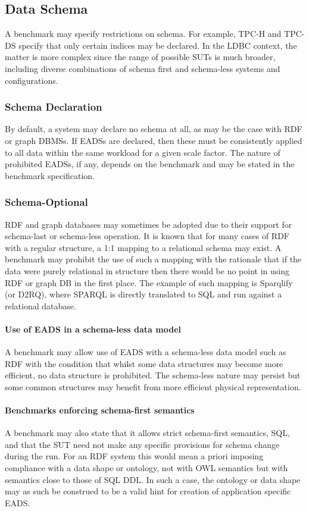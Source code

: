 \subsection{Data Schema}

A benchmark may specify restrictions on schema. For example, \mbox{TPC-H} and \mbox{TPC-DS} specify that only certain indices may be declared. In the LDBC context, the matter is more complex since the range of possible SUTs is much broader, including diverse combinations of schema first and schema-less systems and configurations.

\subsubsection{Schema Declaration}
By default, a system may declare no schema at all, as may be the case with RDF or graph DBMSs. If EADSs are declared, then these must be consistently applied to all data within the same workload for a given scale factor. The nature of prohibited EADSs, if any, depends on the benchmark and may be stated in the benchmark specification.

\subsubsection{Schema-Optional}

RDF and graph databases may sometimes be adopted due to their support for schema-last or schema-less operation. It is known that for many cases of RDF with a regular structure, a 1:1 mapping to a relational schema may exist. A benchmark may prohibit the use of such a mapping with the rationale that if the data were purely relational in structure then there would be no point in using RDF or graph DB in the first place. The example of such mapping is Sparqlify (or D2RQ), where SPARQL is directly translated to SQL and run against a relational database.

\paragraph{Use of EADS in a schema-less data model}
A benchmark may allow use of EADS with a schema-less data model such as RDF with the condition that whilst some data structures may become more efficient, no data structure is prohibited. The schema-less nature may persist but some common structures may benefit from more efficient physical representation.

\paragraph{Benchmarks enforcing schema-first semantics}
A benchmark may also state that it allows strict schema-first semantics, \eg SQL, and that the SUT need not make any specific provisions for schema change during the run. For an RDF system this would mean a priori imposing compliance with a data shape or ontology, not with OWL semantics but with semantics close to those of SQL DDL. In such a case, the ontology or data shape may as such be construed to be a valid hint for creation of application specific EADS.

